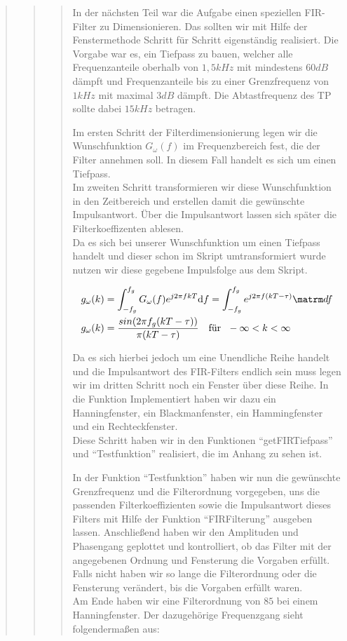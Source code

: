 \begin{quote}
\begin{quote}
\begin{quote}
		    In der nächsten Teil war die Aufgabe einen speziellen FIR-Filter zu Dimensionieren. Das sollten wir mit
		    Hilfe der Fenstermethode Schritt für Schritt eigenständig realisiert. Die Vorgabe war es,
		    ein Tiefpass zu bauen, welcher alle Frequenzanteile oberhalb von $1,5 kHz$
		    mit mindestens $60 dB$ dämpft und Frequenzanteile bis zu einer Grenzfrequenz
		    von $1 kHz$ mit maximal $3 dB$ dämpft. Die Abtastfrequenz des TP sollte
		    dabei $15 kHz$ betragen.\vspace{1em}
		     
		    Im ersten Schritt der Filterdimensionierung legen wir die Wunschfunktion $G_\omega (f)$ im Frequenzbereich fest,
		    die der Filter annehmen soll. In diesem Fall handelt es sich um einen Tiefpass.\\
		    Im zweiten Schritt transformieren wir diese Wunschfunktion in den Zeitbereich und erstellen damit die gewünschte
		    Impulsantwort. Über die Impulsantwort lassen sich später die Filterkoeffizenten ablesen.\\
            Da es sich bei unserer Wunschfunktion um einen Tiefpass handelt und dieser schon im Skript umtransformiert
            wurde nutzen wir diese gegebene Impulsfolge aus dem Skript.
		    
		    \begin{equation*}
            	\begin{split}
            		g_\omega(k) &= \int_{-f_g}^{f_g} G_\omega(f)e^{j2 \pi fkT} \mathrm df = \int_{-f_g}^{f_g} e^{j2\pi
            		f(kT-\tau)} \matrm df\\
            		g_\omega(k) &= \frac{sin(2\pi f_g (kT-\tau))}{\pi (kT-\tau)} \text{\ \ \ für \ } -\infty < k < \infty  
            	\end{split}
            \end{equation*}
		     
		    Da es sich hierbei jedoch um eine Unendliche Reihe handelt und die Impulsantwort des FIR-Filters endlich sein muss
		    legen wir im dritten Schritt noch ein Fenster über diese Reihe. In die Funktion Implementiert haben wir dazu ein
		    Hanningfenster, ein Blackmanfenster, ein Hammingfenster und ein Rechteckfenster.\\
		    
		    Diese Schritt haben wir in den Funktionen ``getFIRTiefpass'' und ``Testfunktion'' realisiert, die im Anhang zu
		    sehen ist.
		    
		    In der Funktion ``Testfunktion'' haben wir nun die gewünschte Grenzfrequenz und die Filterordnung vorgegeben, uns
		    die passenden Filterkoeffizienten sowie die Impulsantwort dieses Filters mit Hilfe der Funktion
		    ``FIRFilterung'' ausgeben lassen. Anschließend haben wir den Amplituden und Phasengang geplottet und
		    kontrolliert, ob das Filter mit der angegebenen Ordnung und Fensterung die Vorgaben erfüllt. Falls nicht haben wir
		    so lange die Filterordnung oder die Fensterung verändert, bis die Vorgaben erfüllt waren.\\
		    Am Ende haben wir eine Filterordnung von $85$ bei einem Hanningfenster. Der dazugehörige Frequenzgang sieht
		    folgendermaßen aus:
		    

\end{quote}
\end{quote}
\end{quote}
